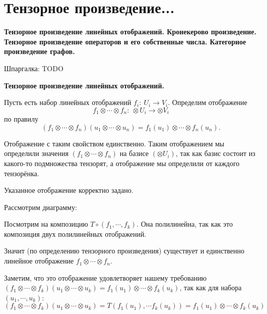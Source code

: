 \section{
 Тензорное произведение... %
}

\textbf{Тензорное произведение линейных отображений. Кронекерово произведение. Тензорное произведение операторов и его собственные числа. Категорное произведение графов.}

Шпаргалка: TODO

\dfn
	{\bf Тензорное произведение линейных отображений.}

	Пусть есть набор линейных отображений $f_i:\ U_i\to V_i$. Определим отображение
	$$
	f_1\otimes\cdots\otimes f_n:\ \otimes U_i\to\otimes V_i
	$$
	по правилу
	$$
	(f_1\otimes\cdots\otimes f_n)(u_1\otimes\cdots\otimes u_n) = f_1(u_1)\otimes\cdots\otimes f_n(u_n).
	$$
\edfn

\lm
	Отображение с таким свойством единственно.
	\proof
		Таким отображением мы определили значения $(f_1\otimes \cdots\otimes f_n)$ на базисе $(\otimes U_i)$, так как базис состоит из какого-то подмножества тензорят, а отображение мы определили от каждого тензорёнка.
	\endproof
\elm

\lm Указанное отображение корректно задано.

	\proof

		Рассмотрим диаграмму:
\begin{center}
\end{center}

		Посмотрим на композицию $T\circ (f_1, \cdots, f_k)$. Она полилинейна, так как это композиция двух полилинейных отображений.

		Значит (по определению тензорного произведения) существует и единственно линейное отображение $f_1\otimes\cdots\otimes f_n$. 

		Заметим, что это отображение удовлетворяет нашему требованию $(f_1\otimes\cdots\otimes f_k)(u_1\otimes\cdots\otimes u_k) = f_1(u_1)\otimes\cdots\otimes f_k(u_k)$, так как для набора $(u_1,\cdots,u_k)$: $(f_1\otimes\cdots\otimes f_k)(u_1\otimes\cdots\otimes u_k) = T(f_1(u_1),\cdots f_k(u_k)) = f_1(u_1)\otimes\cdots\otimes f_k(u_k)$ 
	\endproof
\elm

